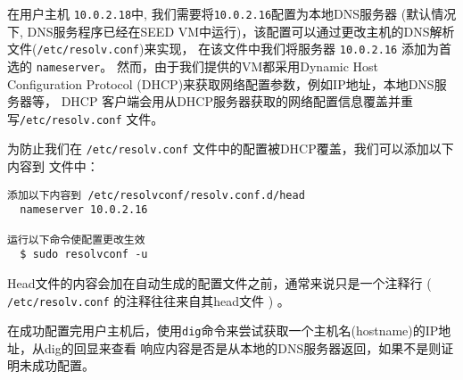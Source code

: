 在用户主机 {\tt 10.0.2.18}中, 我们需要将{\tt 10.0.2.16}配置为本地DNS服务器 (默认情况下, 
DNS服务程序已经在SEED VM中运行)，该配置可以通过更改主机的DNS解析文件(\texttt{/etc/resolv.conf})来实现，
在该文件中我们将服务器 \texttt{10.0.2.16} 添加为首选的 \texttt{nameserver}。
然而，由于我们提供的VM都采用Dynamic Host Configuration Protocol (DHCP)来获取网络配置参数，例如IP地址，本地DNS服务器等，
DHCP 客户端会用从DHCP服务器获取的网络配置信息覆盖并重写\texttt{/etc/resolv.conf} 文件。


为防止我们在 \texttt{/etc/resolv.conf} 文件中的配置被DHCP覆盖，我们可以添加以下内容到
文件中：

\begin{lstlisting}
添加以下内容到 /etc/resolvconf/resolv.conf.d/head
  nameserver 10.0.2.16

运行以下命令使配置更改生效
  $ sudo resolvconf -u
\end{lstlisting}
 
Head文件的内容会加在自动生成的配置文件之前，通常来说只是一个注释行 ( \texttt{/etc/resolv.conf} 的注释往往来自其head文件 ) 。


在成功配置完用户主机后，使用\texttt{dig}命令来尝试获取一个主机名(hostname)的IP地址，从dig的回显来查看
响应内容是否是从本地的DNS服务器返回，如果不是则证明未成功配置。



